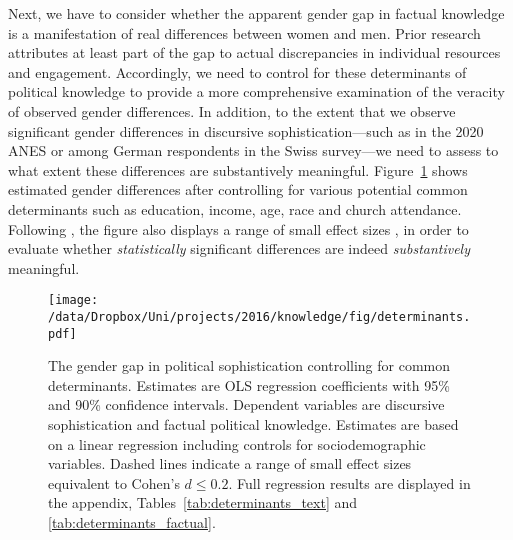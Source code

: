 Next, we have to consider whether the apparent gender gap in factual knowledge is a manifestation of real differences between women and men. Prior research attributes at least part of the gap to actual discrepancies in individual resources and engagement. Accordingly, we need to control for these determinants of political knowledge to provide a more comprehensive examination of the veracity of observed gender differences. In addition, to the extent that we observe significant gender differences in discursive sophistication---such as in the 2020 ANES or among German respondents in the Swiss survey---we need to assess to what extent these differences are substantively meaningful. Figure~\ref{fig:determinants} shows estimated gender differences after controlling for various potential common determinants such as education, income, age, race and church attendance. Following \citet{rainey2014arguing}, the figure also displays a range of small effect sizes \citep[equivalent to Cohen's $d \leq 0.2$; see][]{sawilowsky2009new}, in order to evaluate whether \textit{statistically} significant differences are indeed \textit{substantively} meaningful.

\begin{figure}[h]\centering
\texttt{[image: /data/Dropbox/Uni/projects/2016/knowledge/fig/determinants.pdf]}
\caption[The gender gap in political sophistication after controlling for common determinants.]{The gender gap in political sophistication controlling for common determinants. Estimates are OLS regression coefficients with 95\% and 90\% confidence intervals. Dependent variables are discursive sophistication and factual political knowledge. Estimates are based on a linear regression including controls for sociodemographic variables. Dashed lines indicate a range of small effect sizes equivalent to Cohen's $d \leq 0.2$. Full regression results are displayed in the appendix, Tables~\ref{tab:determinants_text} and \ref{tab:determinants_factual}.}\label{fig:determinants}
\end{figure}

